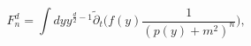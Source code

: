 \begin{equation}
F_n^d =\int  dyy^{\frac{d}{2}-1}
 {\tilde \partial_t}\bigg(f(y)\frac{1}{(p(y)+ m^2)^n}\bigg)
\mbox{,}
\label{thresholds}
\end{equation}

